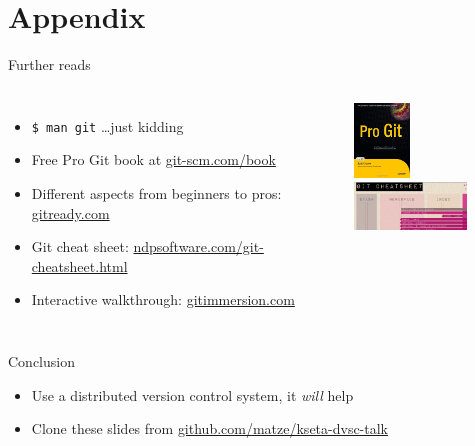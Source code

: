 \documentclass[18pt]{beamer}
\begin{document}
\section{Appendix}

\begin{frame}{Further reads}
  \begin{columns}[T,onlytextwidth]
      \begin{itemize}
        \item \texttt{\$ man git} \ldots just kidding
        \item Free Pro Git book at \url{git-scm.com/book}
        \item Different aspects from beginners to pros: \url{gitready.com}
        \item Git cheat sheet: \url{ndpsoftware.com/git-cheatsheet.html}
        \item Interactive walkthrough: \url{gitimmersion.com}
      \end{itemize}

      \centering
      \includegraphics[width=1.5cm]{images/pro-git}
      \vspace{2em}
      \includegraphics[width=3cm]{images/gcs}
  \end{columns}
\end{frame}

\begin{frame}{Conclusion}
  \begin{itemize}
    \item Use a distributed version control system, it \emph{will} help
    \item Clone these slides from \url{github.com/matze/kseta-dvsc-talk}
  \end{itemize}
\end{frame}
\end{document}
